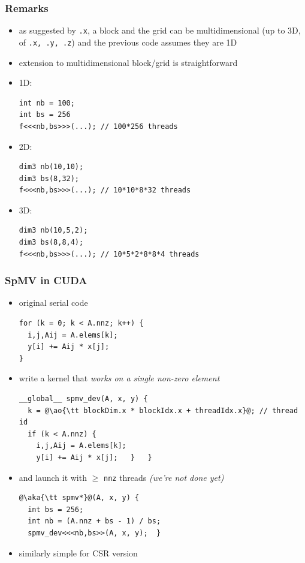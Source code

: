 \documentclass[12pt,dvipdfmx]{beamer}
\newcommand{\ao}[1]{{\color{blue}#1}}
\newcommand{\aka}[1]{{\color{red}#1}}
\begin{document}
\begin{frame}[fragile]
\frametitle{Remarks}
\begin{itemize}
\item as suggested by {\tt .x}, a block and the grid
  can be multidimensional (up to 3D, of {\tt .x, .y, .z})
  and the previous code assumes they are 1D
  
\item extension to multidimensional block/grid is
  straightforward

\item 1D:
\begin{lstlisting}
int nb = 100;
int bs = 256
f<<<nb,bs>>>(...); // 100*256 threads
\end{lstlisting}

\item 2D:
\begin{lstlisting}
dim3 nb(10,10);
dim3 bs(8,32);
f<<<nb,bs>>>(...); // 10*10*8*32 threads
\end{lstlisting}

\item 3D:
\begin{lstlisting}
dim3 nb(10,5,2);
dim3 bs(8,8,4);
f<<<nb,bs>>>(...); // 10*5*2*8*8*4 threads
\end{lstlisting}
\end{itemize}
\end{frame}


\begin{frame}[fragile]
\frametitle{SpMV in CUDA}
\begin{itemize}
  \item original serial code
\begin{lstlisting}
for (k = 0; k < A.nnz; k++) {
  i,j,Aij = A.elems[k];
  y[i] += Aij * x[j];
}
\end{lstlisting}

\item write a kernel that
  \ao{\it works on a single non-zero element}
\begin{lstlisting}
__global__ spmv_dev(A, x, y) {
  k = @\ao{\tt blockDim.x * blockIdx.x + threadIdx.x}@; // thread id
  if (k < A.nnz) {
    i,j,Aij = A.elems[k];
    y[i] += Aij * x[j];   }   }
\end{lstlisting}

\item and launch it with $\geq$ {\tt nnz} threads
  \aka{\it (we're not done yet)}
\begin{lstlisting}
@\aka{\tt spmv*}@(A, x, y) {
  int bs = 256;
  int nb = (A.nnz + bs - 1) / bs;    
  spmv_dev<<<nb,bs>>(A, x, y);  }
\end{lstlisting}

\item similarly simple for CSR version

\end{itemize}
\end{frame}
\end{document}
